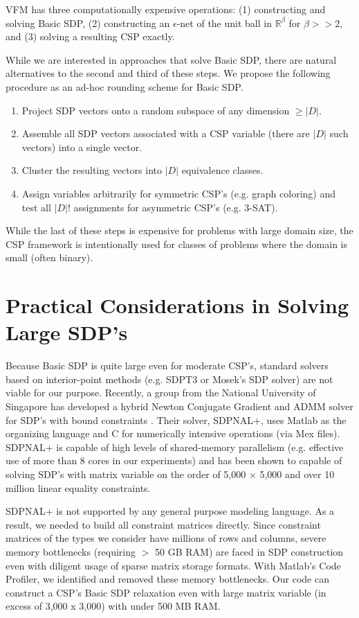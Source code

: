 \documentclass[12pt]{article} %
\begin{document}
VFM has three computationally expensive operations: (1) constructing and solving Basic SDP, (2) constructing an $\epsilon$-net of the unit ball in $\mathbb{R}^\beta$ for $\beta>>2$, and (3) solving a resulting CSP exactly.

While we are interested in approaches that solve Basic SDP, there are natural alternatives to the second and third of these steps. We propose the following procedure as an ad-hoc rounding scheme for Basic SDP.
\begin{enumerate}
\item Project SDP vectors onto a random subspace of any dimension $\geq |D|$.
\item Assemble all SDP vectors associated with a CSP variable (there are $|D|$ such vectors) into a single vector.
\item Cluster the resulting vectors into $|D|$ equivalence classes.
\item Assign variables arbitrarily for symmetric CSP's (e.g. graph coloring) and test all $|D|!$ assignments for asymmetric CSP's (e.g. 3-SAT).
\end{enumerate}

While the last of these steps is expensive for problems with large domain size, the CSP framework is intentionally used for classes of problems where the domain is small (often binary).

\section{Practical Considerations in Solving Large SDP's}

Because Basic SDP is quite large even for moderate CSP's, standard solvers based on interior-point methods (e.g. SDPT3 or Mosek's SDP solver) are not viable for our purpose. Recently, a group from the National University of Singapore has developed a hybrid Newton Conjugate Gradient and ADMM solver for SDP's with bound constraints \cite{yang2015sdpnal+, zhao2010newton}. Their solver, SDPNAL+, uses Matlab as the organizing language and C for numerically intensive operations (via Mex files). SDPNAL+ is capable of high levels of shared-memory parallelism (e.g. effective use of more than 8 cores in our experiments) and has been shown to capable of solving SDP's with matrix variable on the order of 5,000 $\times$ 5,000 and over 10 million linear equality constraints.

SDPNAL+ is not supported by any general purpose modeling language. As a result, we needed to build all constraint matrices directly. Since constraint matrices of the types we consider have millions of rows and columns, severe memory bottlenecks (requiring $>$ 50 GB RAM) are faced in SDP construction even with diligent usage of sparse matrix storage formats. With Matlab's Code Profiler, we identified and removed these memory bottlenecks. Our code can construct a CSP's Basic SDP relaxation even with large matrix variable (in excess of 3,000 x 3,000) with under 500 MB RAM. 
\end{document}
